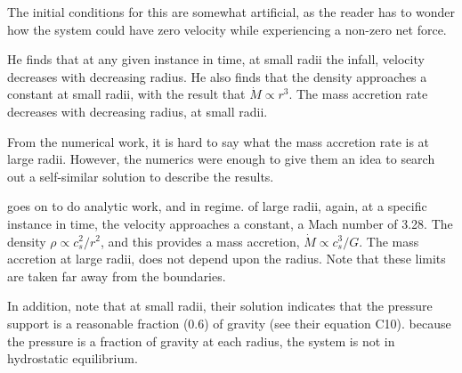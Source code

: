 \documentclass[../dissertation.tex]{subfiles}
\begin{document}
The initial conditions for this are somewhat artificial, as the reader has to wonder how the system could have zero velocity while experiencing a non-zero net force.



He finds that at any given instance in time, at small radii the infall, velocity decreases with decreasing radius.
He also finds that the density approaches a constant at small radii, with the result that $\dot{M} \propto r^3 $. 
The mass accretion rate decreases with decreasing radius, at small radii.

From the numerical work, it is hard to say what the mass accretion rate is at large radii. 
However, the numerics were enough to give them an idea to search out a self-similar solution to describe the results.

\citet{1969MNRAS.145..271L} goes on to do analytic work, and in regime. 
of large radii, again, at a specific instance in time, the velocity approaches a constant, a Mach number of 3.28. 
The density $\rho \propto c_s^2 / r^2$, and this provides a mass accretion, $\dot{M} \propto c_s^3 / G$. 
The mass accretion at large radii, does not depend upon the radius. 
Note that these limits are taken far away from the boundaries.

In addition, \citet{1969MNRAS.145..271L} note that at small radii, their solution indicates that the pressure support is a reasonable fraction (0.6) of gravity (see their equation C10). 
because the  pressure is a fraction of gravity at each radius, the system is not in hydrostatic equilibrium.
\end{document}
